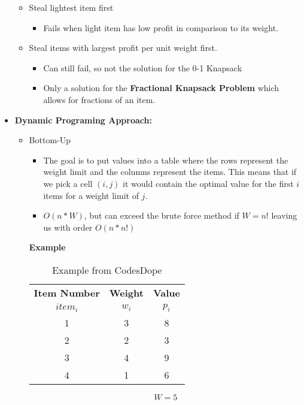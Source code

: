 \begin{itemize}
\begin{itemize}
			\item Steal lightest item first
			\begin{itemize}
				\item Fails when light item has low profit in comparison to its weight.
			\end{itemize}
			
			\item Steal items with largest profit per unit weight first.
			\begin{itemize}
				\item Can still fail, so not the solution for the 0-1 Knapsack
				\item Only a solution for the \textbf{Fractional Knapsack Problem} which allows for fractions of an item.
			\end{itemize}
		\end{itemize}
		
		\item \textbf{Dynamic Programing Approach:}
		\begin{itemize}
			\item Bottom-Up
				\begin{itemize}
					\item The goal is to put values into a table where the rows represent the weight limit and the columns represent the items. This means that if we pick a cell $(i, j)$ it would contain the optimal value for the first $i$ items for a weight limit of $j$.
					\item $O(n * W)$, but can exceed the brute force method if $W = n!$ leaving us with order $O(n*n!)$
				\end{itemize}
				\textbf{Example}
				\begin{table}[h!]
					\begin{center}
						\caption{Example from CodesDope \cite{noauthor_knapsack_nodate-2}}
						\label{tab:example2}
						\begin{tabular}{c|c|c}
							\toprule %
							\textbf{Item Number} & \textbf{Weight} & \textbf{Value}\\
							$item_i$ & $w_i$ & $p_i$ \\
							\midrule %
							1 & 3 & 8 \\
							2 & 2 & 3 \\
							3 & 4 & 9 \\
							4 & 1 & 6 
						\end{tabular}
					\end{center} \vspace{12pt}
					$$
					W = 5
					$$
				\end{table}
			

\end{itemize}
\end{itemize}
